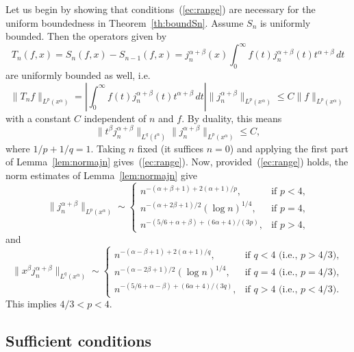 \documentclass[reqno]{amsart}
\theoremstyle{plain}
\theoremstyle{definition}
\theoremstyle{remark}
\newcommand{\lpnorm}[3]{\|{#1}\|_{L^{#2}({#3})}} %
\begin{document}
Let us begin by showing that conditions~(\ref{ec:range})
are necessary for the uniform boundedness in Theorem~\ref{th:boundSn}.
Assume $S_n$ is uniformly bounded. Then the operators given by
\begin{equation*}
   T_n(f,x) = S_n(f,x) - S_{n-1}(f,x) =
   j_n^{\alpha+\beta}(x) \int_0^\infty f(t) j^{\alpha+\beta}_n(t)
   t^{\alpha+\beta} \, dt
\end{equation*}
are uniformly bounded as well, i.e.
\begin{equation*}
    \lpnorm{T_nf}p{x^\alpha}
    = \left| \int_0^\infty f(t) j_n^{\alpha+\beta}(t) t^{\alpha+\beta} \, dt
      \right| \lpnorm{j_n^{\alpha+\beta}}p{x^\alpha}
    \le C \lpnorm{f}p{x^\alpha}
\end{equation*}
with a constant $C$ independent of $n$ and $f$.
By duality, this means
\begin{equation*}
    \lpnorm{t^\beta j_n^{\alpha+\beta}}q{t^\alpha}
    \lpnorm{j_n^{\alpha+\beta}}p{x^\alpha}
    \le C,
\end{equation*}
where $1/p+1/q=1$. Taking $n$ fixed (it suffices $n=0$) and applying the first
part of Lemma~\ref{lem:normajn} gives~(\ref{ec:range}). Now,
provided~(\ref{ec:range}) holds, the norm estimates of Lemma~\ref{lem:normajn}
give
\begin{equation*}
    \lpnorm{j_n^{\alpha+\beta}}{p}{x^\alpha} \sim
    \begin{cases}
    n^{-(\alpha+\beta+1)+2(\alpha+1)/p}, & \text{if $p<4$,} \\
    n^{-(\alpha+2\beta+1)/2}(\log n)^{1/4}, & \text{if $p=4$,} \\
    n^{-(5/6+\alpha+\beta)+(6\alpha+4)/(3p)}, & \text{if $p>4$,}
    \end{cases}
\end{equation*}
and
\begin{equation*}
    \lpnorm{x^\beta j_n^{\alpha+\beta}}{q}{x^\alpha} \sim
    \begin{cases}
    n^{-(\alpha-\beta+1)+2(\alpha+1)/q}, & \text{if $q<4$ (i.e., $p>4/3$)}, \\
    n^{-(\alpha-2\beta+1)/2}(\log n)^{1/4}, & \text{if $q=4$ (i.e., $p=4/3$)},
      \\
    n^{-(5/6+\alpha-\beta)+(6\alpha+4)/(3q)}, & \text{if $q>4$ (i.e.,
      $p<4/3$)}.
    \end{cases}
\end{equation*}
This implies $4/3<p<4$.


\subsection{Sufficient conditions}
\end{document}

